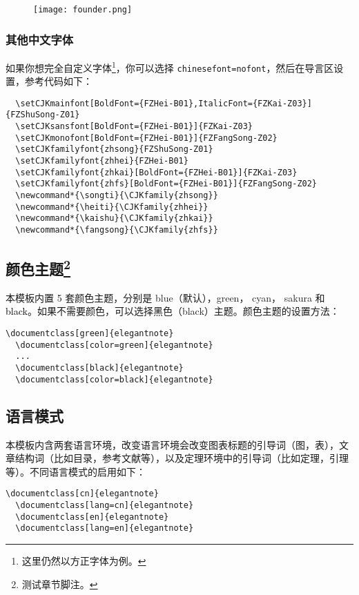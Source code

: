 \documentclass[cn,hazy,blue,14pt,screen]{elegantnote}
\begin{document}
\begin{figure}[!htb]
\centering
\texttt{[image: founder.png]}
\end{figure}

\subsubsection{其他中文字体}
如果你想完全自定义字体\footnote{这里仍然以方正字体为例。}，你可以选择 \lstinline{chinesefont=nofont}，然后在导言区设置，参考代码如下：
\begin{lstlisting}
  \setCJKmainfont[BoldFont={FZHei-B01},ItalicFont={FZKai-Z03}]{FZShuSong-Z01}
  \setCJKsansfont[BoldFont={FZHei-B01}]{FZKai-Z03}
  \setCJKmonofont[BoldFont={FZHei-B01}]{FZFangSong-Z02}
  \setCJKfamilyfont{zhsong}{FZShuSong-Z01}
  \setCJKfamilyfont{zhhei}{FZHei-B01}
  \setCJKfamilyfont{zhkai}[BoldFont={FZHei-B01}]{FZKai-Z03}
  \setCJKfamilyfont{zhfs}[BoldFont={FZHei-B01}]{FZFangSong-Z02}
  \newcommand*{\songti}{\CJKfamily{zhsong}}
  \newcommand*{\heiti}{\CJKfamily{zhhei}}
  \newcommand*{\kaishu}{\CJKfamily{zhkai}}
  \newcommand*{\fangsong}{\CJKfamily{zhfs}}
\end{lstlisting}


\subsection[颜色主题]{颜色主题\footnote{测试章节脚注。}}

本模板内置 5 套颜色主题，分别是 \textcolor{eblue}{blue}（默认），\textcolor{egreen}{green}， \textcolor{ecyan}{cyan}， \textcolor{sakura}{sakura} 和 \textcolor{black}{black}。如果不需要颜色，可以选择黑色（black）主题。颜色主题的设置方法：
\begin{lstlisting}[frame=none]  
  \documentclass[green]{elegantnote}
  \documentclass[color=green]{elegantnote}
  ...
  \documentclass[black]{elegantnote}
  \documentclass[color=black]{elegantnote}
\end{lstlisting}


\subsection{语言模式}

本模板内含两套语言环境，改变语言环境会改变图表标题的引导词（图，表），文章结构词（比如目录，参考文献等），以及定理环境中的引导词（比如定理，引理等）。不同语言模式的启用如下：
\begin{lstlisting}[frame=none]  
  \documentclass[cn]{elegantnote} 
  \documentclass[lang=cn]{elegantnote} 
  \documentclass[en]{elegantnote} 
  \documentclass[lang=en]{elegantnote}
\end{lstlisting}
\end{document}
